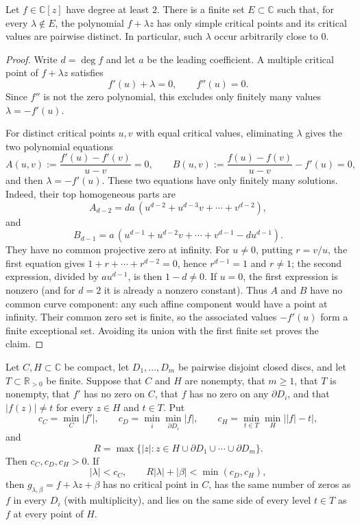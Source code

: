 \begin{proposition}
\label{prop:linear-genericity1041}
Let $f\in\mathbb C[z]$ have degree at least $2$.  There is a finite set
$E\subset\mathbb C$ such that, for every $\lambda\notin E$, the polynomial
$f+\lambda z$ has only simple critical points and its critical values are
pairwise distinct.  In particular, such $\lambda$ occur arbitrarily close to
$0$.
\end{proposition}

\begin{proof}
Write $d=\deg f$ and let $a$ be the leading coefficient.  A multiple critical
point of $f+\lambda z$ satisfies
\[
 f'(u)+\lambda=0,\qquad f''(u)=0.
\]
Since $f''$ is not the zero polynomial, this excludes only finitely many
values $\lambda=-f'(u)$.

For distinct critical points $u,v$ with equal critical values, eliminating
$\lambda$ gives the two polynomial equations
\[
 A(u,v):=\frac{f'(u)-f'(v)}{u-v}=0,
 \qquad
 B(u,v):=\frac{f(u)-f(v)}{u-v}-f'(u)=0,
\tag{4.1}\label{eq:critical-collision}
\]
and then $\lambda=-f'(u)$.  These two equations have only finitely many
solutions.  Indeed, their top homogeneous parts are
\[
 A_{d-2}=da\,(u^{d-2}+u^{d-3}v+\cdots+v^{d-2}),
\]
and
\[
 B_{d-1}=a\,(u^{d-1}+u^{d-2}v+\cdots+v^{d-1}-d u^{d-1}).
\]
They have no common projective zero at infinity.  For $u\ne0$, putting
$r=v/u$, the first equation gives
$1+r+\cdots+r^{d-2}=0$, hence $r^{d-1}=1$ and $r\ne1$; the second expression,
divided by $a u^{d-1}$, is then $1-d\ne0$.  If $u=0$, the first expression is
nonzero (and for $d=2$ it is already a nonzero constant).  Thus $A$ and $B$
have no common curve component: any such affine component would have a point
at infinity.  Their common zero set is finite, so the associated values
$-f'(u)$ form a finite exceptional set.  Avoiding its union with the first
finite set proves the claim.
\end{proof}

\begin{proposition}\label{prop:compact-barrier1041}
Let $C,H\subset\mathbb C$ be compact, let $D_1,\ldots,D_m$ be pairwise
disjoint closed discs, and let $T\subset\mathbb R_{>0}$ be finite.  Suppose
that $C$ and $H$ are nonempty, that $m\geq1$, that $T$ is nonempty,
that $f'$ has no zero on $C$, that $f$ has no zero on any $\partial D_i$, and
that $|f(z)|\ne t$ for every $z\in H$ and $t\in T$.  Put
\[
 c_C=\min_C|f'|,\qquad
 c_D=\min_i\min_{\partial D_i}|f|,\qquad
 c_H=\min_{t\in T}\min_H\bigl||f|-t\bigr|,
\]
and
\[
 R=\max\bigl\{|z|:z\in H\cup\partial D_1\cup\cdots\cup\partial D_m\bigr\}.
\]
Then $c_C,c_D,c_H>0$.  If
\[
 |\lambda|<c_C,
 \qquad
 R|\lambda|+|\beta|<\min(c_D,c_H),
\tag{4.2}\label{eq:compact-barrier-budget}
\]
then $g_{\lambda,\beta}=f+\lambda z+\beta$ has no critical point in $C$,
has the same number of zeros as $f$ in every $D_i$ (with multiplicity), and
lies on the same side of every level $t\in T$ as $f$ at every point of $H$.
\end{proposition}

